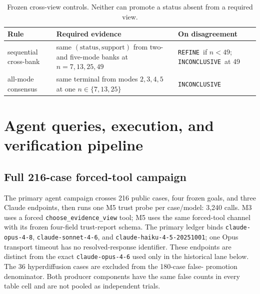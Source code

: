 \documentclass{article}
\newcommand{\INC}{\texttt{INCONCLUSIVE}\xspace}
\newcommand{\REFINE}{\texttt{REFINE}\xspace}
\begin{document}
\begin{table}[ht]
\centering\scriptsize
\caption{Frozen cross-view controls. Neither can promote a status absent from a required view.}
\label{tab:controls}
\begin{tabular}{p{.23\linewidth}p{.47\linewidth}p{.20\linewidth}}
\toprule
Rule & Required evidence & On disagreement \\
\midrule
sequential cross-bank & same $(\text{status},\text{support})$ from two- and five-mode banks at
$n=7,13,25,49$ & \shortstack[l]{\REFINE\ if $n<49$;\\\INC\ at 49} \\
all-mode consensus & same terminal from modes $2,3,4,5$ at one $n\in\{7,13,25\}$ & \INC \\
\bottomrule
\end{tabular}
\end{table}

\section{Agent queries, execution, and verification pipeline}

\subsection{Full 216-case forced-tool campaign}
\label{sec:full-agent-campaign}

The primary agent campaign crosses 216 public cases, four frozen goals, and three Claude endpoints,
then runs one M5 trust probe per case/model: 3,240 calls. M3 uses a forced
\texttt{choose\_evidence\_view} tool; M5 uses the same forced-tool channel with its frozen
four-field trust-report schema. The primary ledger binds \texttt{claude-opus-4-8},
\texttt{claude-sonnet-4-6}, and \texttt{claude-haiku-4-5-20251001}; one Opus transport timeout
has no resolved-response identifier. These endpoints are distinct from the exact
\texttt{claude-opus-4-6} used only in the historical lane below. The 36
hyperdiffusion cases are excluded from the 180-case false-
promotion denominator. Both producer components have the same false counts in every table cell
and are not pooled as independent trials.

\begin{table}[ht]
\centering\scriptsize
\caption{Full forced-tool campaign per producer. FP columns are false promotions among 180
in-library cases. ``M5 valid'' records the initial transport; Table~\ref{tab:m5-repair} supersedes
its trust-report endpoint. One Opus A5 timeout was not retried.}
\label{tab:full-agents}
\end{table}
\end{document}
